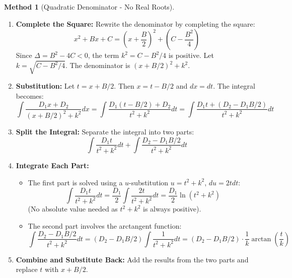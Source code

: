 \documentclass[11pt]{article}
\theoremstyle{plain}
\theoremstyle{definition}
\newtheorem{method}[theorem]{Method}
\theoremstyle{remark}
\begin{document}
\begin{method}[Quadratic Denominator - No Real Roots]
\leavevmode
\begin{enumerate}
    \item \textbf{Complete the Square:} Rewrite the denominator by completing the square:
    \[ x^2+Bx+C = \left(x + \frac{B}{2}\right)^2 + \left(C - \frac{B^2}{4}\right) \]
    Since $\Delta = B^2-4C < 0$, the term $k^2 = C - B^2/4$ is positive. Let $k = \sqrt{C-B^2/4}$. The denominator is $(x+B/2)^2 + k^2$.
    \item \textbf{Substitution:} Let $t = x+B/2$. Then $x=t-B/2$ and $dx=dt$. The integral becomes:
    \[ \int \frac{D_1 x + D_2}{(x+B/2)^2 + k^2} dx = \int \frac{D_1(t-B/2) + D_2}{t^2 + k^2} dt = \int \frac{D_1 t + (D_2 - D_1 B/2)}{t^2 + k^2} dt \]
    \item \textbf{Split the Integral:} Separate the integral into two parts:
    \[ \int \frac{D_1 t}{t^2 + k^2} dt + \int \frac{D_2 - D_1 B/2}{t^2 + k^2} dt \]
    \item \textbf{Integrate Each Part:}
    \begin{itemize}
        \item The first part is solved using a $u$-substitution $u=t^2+k^2$, $du=2t dt$:
        \[ \int \frac{D_1 t}{t^2 + k^2} dt = \frac{D_1}{2} \int \frac{2t}{t^2 + k^2} dt = \frac{D_1}{2} \ln(t^2 + k^2) \]
        (No absolute value needed as $t^2+k^2$ is always positive).
        \item The second part involves the arctangent function:
        \[ \int \frac{D_2 - D_1 B/2}{t^2 + k^2} dt = (D_2 - D_1 B/2) \int \frac{1}{t^2 + k^2} dt = (D_2 - D_1 B/2) \cdot \frac{1}{k} \arctan\left(\frac{t}{k}\right) \]
    \end{itemize}
    \item \textbf{Combine and Substitute Back:} Add the results from the two parts and replace $t$ with $x+B/2$.
\end{enumerate}
\end{method}
\end{document}
